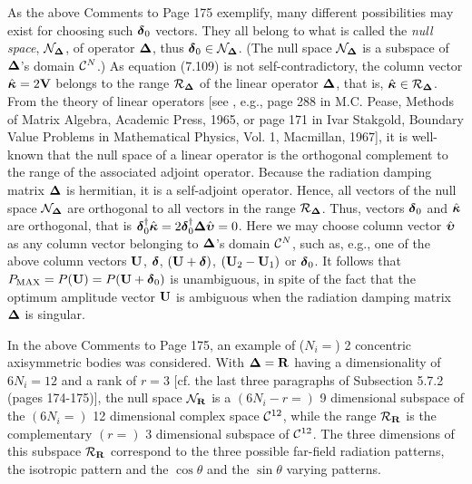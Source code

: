 \documentclass[a4paper,12pt]{article}
\newcommand{\bdelta}{\mbox{\boldmath ${\rm \delta}$}}
\newcommand{\bupsi}{\mbox{\boldmath ${\rm \upsilon}$}}
\newcommand{\bkappa}{\mbox{\boldmath $\rm \kappa$}}
\begin{document}
As the above Comments to Page 175 exemplify, many different possibilities may exist for choosing such $\bdelta_0$ vectors. They all belong to what is called the {\it null space}, ${\cal N}_{\bf \Delta}$, of operator $\bf \Delta$, thus $\bdelta_0 \in {\cal N}_{\bf \Delta}$. (The null space ${\cal N}_{\bf \Delta}$ is a subspace of %
${\bf \Delta}$'s
%
domain ${\cal C}^{N}$.) As equation (7.109) is not self-contradictory, the column vector $\hat{\bkappa} = 2 {\bf V}$ belongs to the range ${\cal R}_{\bf \Delta}$ of the linear operator $\bf \Delta$, that is, $\hat{\bkappa} \in {\cal R}_{\bf \Delta}$. From the theory of linear operators
[see
, e.g., page 288 in M.C. Pease, Methods of Matrix Algebra, Academic Press, 1965, or page 171 in Ivar Stakgold, Boundary Value Problems in Mathematical Physics, Vol. 1, Macmillan, 1967], 
it is well-known that the null space of a linear operator is the orthogonal complement to the range of the associated adjoint operator. Because the radiation damping matrix $\bf \Delta$ is hermitian, it is a self-adjoint operator. Hence, all vectors of the null space ${\cal N}_{\bf \Delta}$ are orthogonal to all vectors in the range ${\cal R}_{\bf \Delta}$. Thus, vectors $\bdelta_0$ and $\hat{\bkappa}$ are orthogonal, that is ${\bdelta}_0^{\dagger} \hat{\bkappa} = 2{\bdelta}_0^{\dagger} {\bf \Delta} \hat{\bupsi} = 0$. Here we may choose column vector $\hat{\bupsi}$ as any column vector belonging to ${\bf \Delta}$'s domain ${\cal C}^{N}$, such as, e.g., one of the above column vectors $\bf U$, $\bdelta$, $(\bf U + \bdelta)$, $({\bf U}_2 - {\bf U}_1)$ or $\bdelta_0$. It follows that $P_{\rm MAX} = P({\bf U}) = P({\bf U} + \bdelta_0)$ is unambiguous, in spite of the fact that the optimum amplitude vector ${\bf U}$ is ambiguous when the radiation damping matrix $\bf \Delta$ is singular.

In the above Comments to Page 175, an example of ($N_i =$) 2 concentric axisymmetric bodies was considered. With  ${\bf \Delta} = \bf R$ having a dimensionality of $6 N_i = 12$ and a rank of $r = 3$
[cf. the last three paragraphs of Subsection 5.7.2 (pages 174-175)], %
 the null space ${\cal N}_{\bf R}$ is a $(6 N_i - r =)$ 9 dimensional subspace of the $(6 N_i =)$ 12 dimensional complex space ${\cal C}^{12}$, while the range ${\cal R}_{\bf R}$ is the complementary $(r =)$ 3 dimensional subspace of ${\cal C}^{12}$. The three dimensions of this subspace ${\cal R}_{\bf R}$ 
correspond to the three possible far-field radiation patterns, the isotropic pattern and the $\cos \theta$ and the $\sin \theta$ varying patterns.\vspace{0.3cm}\vspace{0.1cm} %
\end{document}
